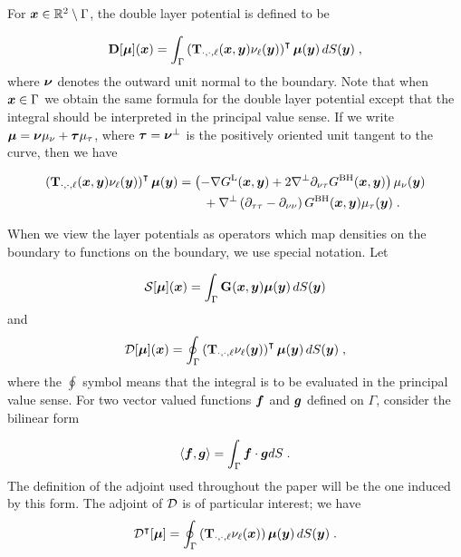 For ${\boldsymbol x} \in \mathbb{R}^2 \setminus \Gamma$, the double layer
potential is defined to be

\begin{equation} \label{eq:doublelayer}
  {\bf D} [{\boldsymbol \mu}] ({\boldsymbol x}) = \int_\Gamma \left ( {\bf T}_{\cdot,\cdot,\ell}({\boldsymbol x},{\boldsymbol y})
  \nu_\ell({\boldsymbol y})\right )^\intercal {\boldsymbol \mu}({\boldsymbol y}) \, dS({\boldsymbol y}) \; ,
\end{equation}
where ${\boldsymbol \nu}$ denotes the outward unit normal to the boundary.
Note that when ${\boldsymbol x} \in \Gamma$ we obtain the same formula
for the double layer potential except that the integral should be
interpreted in the principal value sense. 
If we write ${\boldsymbol \mu} = {\boldsymbol \nu} \mu_\nu + {\boldsymbol \tau} \mu_\tau$,
where ${\boldsymbol \tau} = {\boldsymbol \nu}^\bot$ is the positively oriented unit
tangent to the curve, then we have

\begin{align} \label{eq:stokesdlkernel}
  \left ( {\bf T}_{\cdot,\cdot,\ell}({\boldsymbol x},{\boldsymbol y})\nu_\ell({\boldsymbol y}) \right )^\intercal
  {\boldsymbol \mu}({\boldsymbol y}) &= \left ( - \nabla G^{\textrm{L}}({\boldsymbol x},{\boldsymbol y}) + 2 \nabla^\bot
  \partial_{\nu\tau} G^{\textrm{BH}}({\boldsymbol x},{\boldsymbol y}) \right ) \mu_\nu({\boldsymbol y}) \nonumber \\
  & \qquad+
  \nabla^\bot \left (\partial_{\tau\tau}-\partial_{\nu\nu} \right )
  G^{\textrm{BH}}({\boldsymbol x},{\boldsymbol y}) \mu_\tau({\boldsymbol y}) \; .
\end{align}

When we view the layer potentials as
operators which map densities on the boundary to functions
on the boundary, we use special notation. Let

\begin{equation}
  {\mathcal S} [{\boldsymbol \mu}] ({\boldsymbol x}) = \int_\Gamma {\bf G} ({\boldsymbol x},{\boldsymbol y}) {\boldsymbol \mu}({\boldsymbol y})
  \, dS({\boldsymbol y})
\end{equation}
and
\begin{equation}
\label{eq:dlformula}
  {\mathcal D} [{\boldsymbol \mu}] ({\boldsymbol x}) = \oint_\Gamma \left ( {\bf T}_{\cdot,\cdot,\ell}\nu_\ell({\boldsymbol y})
  \right )^\intercal {\boldsymbol \mu}({\boldsymbol y}) \, dS({\boldsymbol y}) \; ,
\end{equation}
where the $\oint$ symbol means that the integral is to be
evaluated in the principal value sense. For two vector valued
functions ${\boldsymbol f}$ and ${\boldsymbol g}$ defined on $\Gamma$, consider the bilinear
form

\begin{equation} \label{eq:bi_form}
  \langle {\boldsymbol f} , {\boldsymbol g} \rangle = \int_\Gamma {\boldsymbol f} \cdot {\boldsymbol g} dS \; .
\end{equation}
The definition of the adjoint used throughout the paper will be
the one induced by this form.
The adjoint of ${\mathcal D}$ is of particular interest; we have
\begin{equation}
  {\mathcal D}^{\intercal} [{\boldsymbol \mu}] = \oint_\Gamma \left ( {\bf T}_{\cdot,\cdot,\ell}\nu_\ell({\boldsymbol x})
  \right ) {\boldsymbol \mu}({\boldsymbol y}) \, dS({\boldsymbol y}) \; .
\end{equation}


